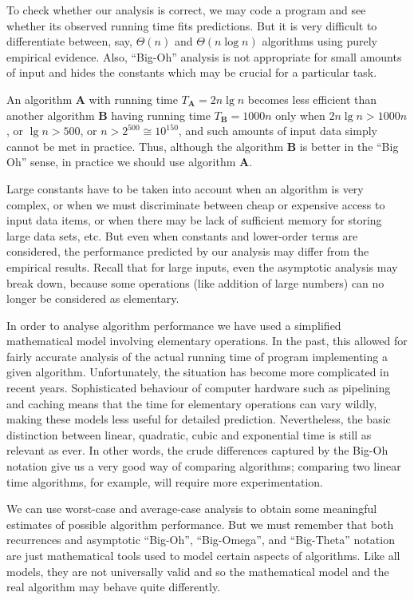 To check whether our analysis is correct, we may code
a program and see whether its observed running time fits
predictions. But it is very
difficult to differentiate between, say, 
$\Theta(n)$ and $\Theta(n \log n)$
algorithms using purely empirical evidence. 
Also, ``Big-Oh'' 
analysis is not appropriate for small amounts of input and
hides the constants which may be crucial for a particular
task. 

\begin{Example}
An algorithm \textbf{A} with running time $T_{\mathbf{A}}=2n \lg n$
becomes less efficient than another algorithm \textbf{B} having 
running time $T_{\mathbf{B}}=1000n$
only when \(2n \lg n > 1000 n\), or
$ \lg n > 500$, or \(n > 2^{500} \cong 10^{150}\),
and such amounts of input data simply cannot be met in practice.
Thus, although the algorithm \textbf{B} is better in the
``Big Oh'' sense, in practice we should use algorithm \textbf{A}.
\end{Example}


Large constants have to be taken into account when
an algorithm is very complex, or when we must discriminate
between cheap or expensive access to input data items,
or when there may be lack of sufficient memory for storing
large data sets, etc. But even when constants and lower-order
terms are considered, the performance predicted by our analysis 
may differ from the empirical results. Recall that for  large 
inputs, even the asymptotic analysis may break down, because some operations 
(like addition of large numbers) can no longer be considered as elementary.

In order to analyse algorithm performance we have used a simplified mathematical 
model involving elementary operations. In the past, this allowed for fairly 
accurate analysis of the actual running time of program implementing a given 
algorithm. Unfortunately, the situation has become more complicated in recent 
years. Sophisticated behaviour of computer hardware such as pipelining and 
caching means that the time for elementary operations can vary wildly, 
making these models less useful for detailed prediction. Nevertheless, the basic
distinction between linear, quadratic, cubic and exponential time is still as 
relevant as ever. In other words, the crude differences captured by the Big-Oh 
notation give us a very good way of comparing algorithms; 
comparing two linear time algorithms, for example, will require more 
experimentation.

We can use worst-case and average-case analysis to obtain some meaningful estimates
of possible algorithm performance. But we must remember that both
recurrences and asymptotic ``Big-Oh'', ``Big-Omega'', and
``Big-Theta'' notation are just mathematical tools used to model certain
aspects of algorithms. Like all models, they are not universally valid
and so the mathematical model and the real algorithm may behave quite
differently.

